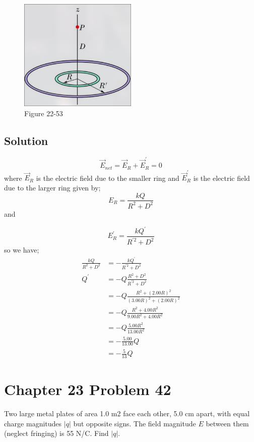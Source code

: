\documentclass{article}
\begin{document}
\begin{figure}[h]
    \centering
    \includegraphics[width=0.5\textwidth]{image-1.png}
    \caption{Figure 22-53}
\end{figure}

\subsection*{Solution}
\[
\vec{E}_{net} = \vec{E}_R + \vec{E}_R^\prime = 0
\]
where $\vec{E}_R$ is the electric field due to the smaller ring and $\vec{E}_R^\prime$ is the electric field due to the larger ring given by;
\[
E_R = \frac{kQ}{R^2 + D^2}
\]
and

\[
E_R^\prime = \frac{kQ^\prime}{R^{\prime2} + D^2}
\]
so we have;
\begin{align*}
    \frac{kQ}{R^2 + D^2} &= -\frac{kQ^\prime}{R^{\prime2} + D^2} \\
    Q^\prime &= -Q \frac{R^2 + D^2}{R^{\prime2} + D^2} \\
    &= -Q \frac{R^2 + (2.00R)^2}{(3.00R)^2 + (2.00R)^2} \\
    &= -Q \frac{R^2 + 4.00R^2}{9.00R^2 + 4.00R^2} \\
    &= -Q \frac{5.00R^2}{13.00R^2} \\
    &= -\frac{5.00}{13.00}Q \\
    &= \boxed{-\frac{5}{13}Q}
\end{align*}

\section*{Chapter 23 Problem 42}
Two large metal plates of area 1.0 m2 face each other,
5.0 cm apart, with equal charge magnitudes $|q|$ but opposite
signs. The field magnitude $E$ between them
(neglect fringing) is 55 N/C. Find $|q|$.
\end{document}

